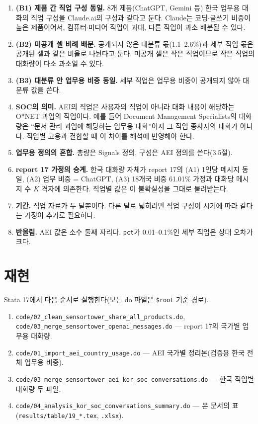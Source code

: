 \documentclass[11pt]{article}
\begin{document}
\begin{enumerate}[leftmargin=*]
  \item \textbf{(B1) 제품 간 직업 구성 동일.} 8개 제품(ChatGPT, Gemini 등) 한국 업무용 대화의 직업 구성을 Claude.ai의 구성과 같다고 둔다. Claude는 코딩$\cdot$글쓰기 비중이 높은 제품이어서, 컴퓨터$\cdot$미디어 직업이 과대, 다른 직업이 과소 배분될 수 있다.
  \item \textbf{(B2) 미공개 셀 비례 배분.} 공개되지 않은 대분류 몫(1.1--2.6\%)과 세부 직업 몫은 공개된 셀과 같은 비율로 나뉜다고 둔다. 미공개 셀은 작은 직업이므로 작은 직업의 대화량이 다소 과소일 수 있다.
  \item \textbf{(B3) 대분류 안 업무용 비중 동일.} 세부 직업은 업무용 비중이 공개되지 않아 대분류 값을 쓴다.
  \item \textbf{SOC의 의미.} AEI의 직업은 사용자의 직업이 아니라 대화 내용이 해당하는 O*NET 과업의 직업이다. 예를 들어 Document Management Specialists의 대화량은 ``문서 관리 과업에 해당하는 업무용 대화''이지 그 직업 종사자의 대화가 아니다. 직업별 고용과 결합할 때 이 차이를 해석에 반영해야 한다.
  \item \textbf{업무용 정의의 혼합.} 총량은 Signals 정의, 구성은 AEI 정의를 쓴다(3.5절).
  \item \textbf{report 17 가정의 승계.} 한국 대화량 자체가 report 17의 (A1) 1인당 메시지 동일, (A2) 업무 비중 = ChatGPT, (A3) 18개국 비중 61.01\% 가정과 대화당 메시지 수 $K$ 격자에 의존한다. 직업별 값은 이 불확실성을 그대로 물려받는다.
  \item \textbf{기간.} 직업 자료가 두 달뿐이다. 다른 달로 넓히려면 직업 구성이 시기에 따라 같다는 가정이 추가로 필요하다.
  \item \textbf{반올림.} AEI 값은 소수 둘째 자리다. \texttt{pct}가 0.01--0.1\%인 세부 직업은 상대 오차가 크다.
\end{enumerate}

\section{재현}

Stata 17에서 다음 순서로 실행한다(모든 do 파일은 \texttt{\$root} 기준 경로).
\begin{enumerate}[leftmargin=*]
  \item \texttt{code/02\_clean\_sensortower\_share\_all\_products.do}, \texttt{code/03\_merge\_sensortower\_openai\_messages.do} --- report 17의 국가별 업무용 대화량.
  \item \texttt{code/01\_import\_aei\_country\_usage.do} --- AEI 국가별 정리본(검증용 한국 전체 업무용 비중).
  \item \texttt{code/03\_merge\_sensortower\_aei\_kor\_soc\_conversations.do} --- 한국 직업별 대화량 두 파일.
  \item \texttt{code/04\_analysis\_kor\_soc\_conversations\_summary.do} --- 본 문서의 표(\texttt{results/table/19\_*.tex}, \texttt{.xlsx}).
\end{enumerate}

\printbibliography[title={참고문헌}]
\end{document}
